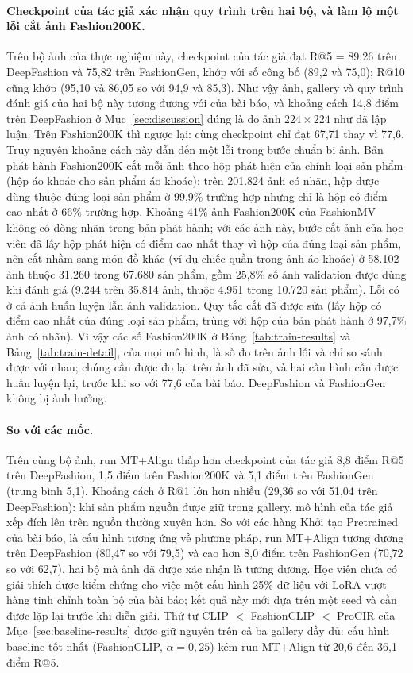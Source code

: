 \paragraph{Checkpoint của tác giả xác nhận quy trình trên hai bộ, và làm lộ một lỗi cắt ảnh Fashion200K.} Trên bộ ảnh của thực nghiệm này, checkpoint của tác giả đạt R@5 = 89,26 trên DeepFashion và 75,82 trên FashionGen, khớp với số công bố (89,2 và 75,0); R@10 cũng khớp (95,10 và 86,05 so với 94,9 và 85,3). Như vậy ảnh, gallery và quy trình đánh giá của hai bộ này tương đương với của bài báo, và khoảng cách 14,8 điểm trên DeepFashion ở Mục~\ref{sec:discussion} đúng là do ảnh $224 \times 224$ như đã lập luận. Trên Fashion200K thì ngược lại: cùng checkpoint chỉ đạt 67,71 thay vì 77,6. Truy nguyên khoảng cách này dẫn đến một lỗi trong bước chuẩn bị ảnh. Bản phát hành Fashion200K cắt mỗi ảnh theo hộp phát hiện của chính loại sản phẩm (hộp áo khoác cho sản phẩm áo khoác): trên 201.824 ảnh có nhãn, hộp được dùng thuộc đúng loại sản phẩm ở 99,9\% trường hợp nhưng chỉ là hộp có điểm cao nhất ở 66\% trường hợp. Khoảng 41\% ảnh Fashion200K của FashionMV không có dòng nhãn trong bản phát hành; với các ảnh này, bước cắt ảnh của học viên đã lấy hộp phát hiện có điểm cao nhất thay vì hộp của đúng loại sản phẩm, nên cắt nhầm sang món đồ khác (ví dụ chiếc quần trong ảnh áo khoác) ở 58.102 ảnh thuộc 31.260 trong 67.680 sản phẩm, gồm 25,8\% số ảnh validation được dùng khi đánh giá (9.244 trên 35.814 ảnh, thuộc 4.951 trong 10.720 sản phẩm). Lỗi có ở cả ảnh huấn luyện lẫn ảnh validation. Quy tắc cắt đã được sửa (lấy hộp có điểm cao nhất của đúng loại sản phẩm, trùng với hộp của bản phát hành ở 97,7\% ảnh có nhãn). Vì vậy các số Fashion200K ở Bảng~\ref{tab:train-results} và Bảng~\ref{tab:train-detail}, của mọi mô hình, là số đo trên ảnh lỗi và chỉ so sánh được với nhau; chúng cần được đo lại trên ảnh đã sửa, và hai cấu hình cần được huấn luyện lại, trước khi so với 77,6 của bài báo. DeepFashion và FashionGen không bị ảnh hưởng.

\paragraph{So với các mốc.} Trên cùng bộ ảnh, run MT+Align thấp hơn checkpoint của tác giả 8,8 điểm R@5 trên DeepFashion, 1,5 điểm trên Fashion200K và 5,1 điểm trên FashionGen (trung bình 5,1). Khoảng cách ở R@1 lớn hơn nhiều (29,36 so với 51,04 trên DeepFashion): khi sản phẩm nguồn được giữ trong gallery, mô hình của tác giả xếp đích lên trên nguồn thường xuyên hơn. So với các hàng Khởi tạo Pretrained của bài báo, là cấu hình tương ứng về phương pháp, run MT+Align tương đương trên DeepFashion (80,47 so với 79,5) và cao hơn 8,0 điểm trên FashionGen (70,72 so với 62,7), hai bộ mà ảnh đã được xác nhận là tương đương. Học viên chưa có giải thích được kiểm chứng cho việc một cấu hình 25\% dữ liệu với LoRA vượt hàng tinh chỉnh toàn bộ của bài báo; kết quả này mới dựa trên một seed và cần được lặp lại trước khi diễn giải. Thứ tự CLIP $<$ FashionCLIP $<$ ProCIR của Mục~\ref{sec:baseline-results} được giữ nguyên trên cả ba gallery đầy đủ: cấu hình baseline tốt nhất (FashionCLIP, $\alpha = 0{,}25$) kém run MT+Align từ 20,6 đến 36,1 điểm R@5.

